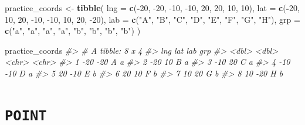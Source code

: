 \documentclass[
]{report}
\newenvironment{Shaded}{\begin{snugshade}}{\end{snugshade}}
\newcommand{\CommentTok}[1]{\textcolor[rgb]{0.56,0.35,0.01}{\textit{#1}}}
\newcommand{\DataTypeTok}[1]{\textcolor[rgb]{0.13,0.29,0.53}{#1}}
\newcommand{\DecValTok}[1]{\textcolor[rgb]{0.00,0.00,0.81}{#1}}
\newcommand{\KeywordTok}[1]{\textcolor[rgb]{0.13,0.29,0.53}{\textbf{#1}}}
\newcommand{\NormalTok}[1]{#1}
\newcommand{\OperatorTok}[1]{\textcolor[rgb]{0.81,0.36,0.00}{\textbf{#1}}}
\newcommand{\StringTok}[1]{\textcolor[rgb]{0.31,0.60,0.02}{#1}}
\begin{document}
\begin{Shaded}
\begin{Highlighting}[]
\NormalTok{practice\_coords \textless{}{-}}\StringTok{ }\KeywordTok{tibble}\NormalTok{(}
  \DataTypeTok{lng =} \KeywordTok{c}\NormalTok{(}\OperatorTok{{-}}\DecValTok{20}\NormalTok{, }\DecValTok{{-}20}\NormalTok{, }\DecValTok{{-}10}\NormalTok{, }\DecValTok{{-}10}\NormalTok{, }\DecValTok{20}\NormalTok{, }\DecValTok{20}\NormalTok{,  }\DecValTok{10}\NormalTok{,  }\DecValTok{10}\NormalTok{), }
  \DataTypeTok{lat =} \KeywordTok{c}\NormalTok{(}\OperatorTok{{-}}\DecValTok{20}\NormalTok{, }\DecValTok{10}\NormalTok{, }\DecValTok{20}\NormalTok{, }\DecValTok{{-}10}\NormalTok{, }\DecValTok{{-}10}\NormalTok{,  }\DecValTok{10}\NormalTok{,  }\DecValTok{20}\NormalTok{, }\DecValTok{{-}20}\NormalTok{),}
  \DataTypeTok{lab =} \KeywordTok{c}\NormalTok{(}\StringTok{"A"}\NormalTok{, }\StringTok{"B"}\NormalTok{, }\StringTok{"C"}\NormalTok{, }\StringTok{"D"}\NormalTok{, }\StringTok{"E"}\NormalTok{, }\StringTok{"F"}\NormalTok{, }\StringTok{"G"}\NormalTok{, }\StringTok{"H"}\NormalTok{),}
  \DataTypeTok{grp =} \KeywordTok{c}\NormalTok{(}\StringTok{"a"}\NormalTok{, }\StringTok{"a"}\NormalTok{, }\StringTok{"a"}\NormalTok{, }\StringTok{"a"}\NormalTok{, }\StringTok{"b"}\NormalTok{, }\StringTok{"b"}\NormalTok{, }\StringTok{"b"}\NormalTok{, }\StringTok{"b"}\NormalTok{)}
\NormalTok{)}

\NormalTok{practice\_coords}
\CommentTok{\#\textgreater{} \# A tibble: 8 x 4}
\CommentTok{\#\textgreater{}     lng   lat lab   grp  }
\CommentTok{\#\textgreater{}   \textless{}dbl\textgreater{} \textless{}dbl\textgreater{} \textless{}chr\textgreater{} \textless{}chr\textgreater{}}
\CommentTok{\#\textgreater{} 1   {-}20   {-}20 A     a    }
\CommentTok{\#\textgreater{} 2   {-}20    10 B     a    }
\CommentTok{\#\textgreater{} 3   {-}10    20 C     a    }
\CommentTok{\#\textgreater{} 4   {-}10   {-}10 D     a    }
\CommentTok{\#\textgreater{} 5    20   {-}10 E     b    }
\CommentTok{\#\textgreater{} 6    20    10 F     b    }
\CommentTok{\#\textgreater{} 7    10    20 G     b    }
\CommentTok{\#\textgreater{} 8    10   {-}20 H     b}
\end{Highlighting}
\end{Shaded}

\hypertarget{point}{%
\section{\texorpdfstring{\texttt{POINT}}{POINT}}\label{point}}
\end{document}
